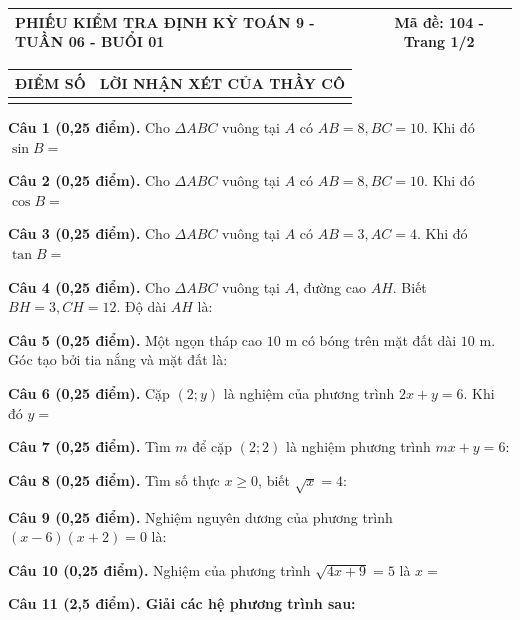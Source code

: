 \documentclass[12pt,a4paper]{article}
\begin{document}
\noindent
\begin{tabularx}{\linewidth}{|X|c|}
\hline
\textbf{PHIẾU KIỂM TRA ĐỊNH KỲ TOÁN 9 - TUẦN 06 - BUỔI 01} & \textbf{Mã đề: 104 - Trang 1/2} \\
\hline
\end{tabularx}

\vspace{1.0mm}

\noindent
\begin{tabularx}{\linewidth}{|p{3.2cm}|X|}
\hline
\centering\textbf{ĐIỂM SỐ} & \centering\textbf{LỜI NHẬN XÉT CỦA THẦY CÔ} \tabularnewline
\hline
\rule{0pt}{1.8cm} & \tabularnewline
\hline
\end{tabularx}

\vspace{1.2mm}
\noindent\textbf{Câu 1 (0,25 điểm).} Cho $\Delta ABC$ vuông tại $A$ có $AB = 8, BC = 10$. Khi đó $\sin B =$ \par\vspace{0.8mm}
\noindent\textbf{Câu 2 (0,25 điểm).} Cho $\Delta ABC$ vuông tại $A$ có $AB = 8, BC = 10$. Khi đó $\cos B =$ \par\vspace{0.8mm}
\noindent\textbf{Câu 3 (0,25 điểm).} Cho $\Delta ABC$ vuông tại $A$ có $AB = 3, AC = 4$. Khi đó $\tan B =$ \par\vspace{0.8mm}
\noindent\textbf{Câu 4 (0,25 điểm).} Cho $\Delta ABC$ vuông tại $A$, đường cao $AH$. Biết $BH=3, CH=12$. Độ dài $AH$ là: \par\vspace{0.8mm}
\noindent\textbf{Câu 5 (0,25 điểm).} Một ngọn tháp cao $10\text{ m}$ có bóng trên mặt đất dài $10\text{ m}$. Góc tạo bởi tia nắng và mặt đất là: \par\vspace{0.8mm}
\noindent\textbf{Câu 6 (0,25 điểm).} Cặp $(2; y)$ là nghiệm của phương trình $2x + y = 6$. Khi đó $y =$ \par\vspace{0.8mm}
\noindent\textbf{Câu 7 (0,25 điểm).} Tìm $m$ để cặp $(2; 2)$ là nghiệm phương trình $mx + y = 6$: \par\vspace{0.8mm}
\noindent\textbf{Câu 8 (0,25 điểm).} Tìm số thực $x \ge 0$, biết $\sqrt{x} = 4$: \par\vspace{0.8mm}
\noindent\textbf{Câu 9 (0,25 điểm).} Nghiệm nguyên dương của phương trình $(x - 6)(x + 2) = 0$ là: \par\vspace{0.8mm}
\noindent\textbf{Câu 10 (0,25 điểm).} Nghiệm của phương trình $\sqrt{4x + 9} = 5$ là $x =$ \par\vspace{0.8mm}
\vspace{0.8mm}
\noindent\textbf{Câu 11 (2,5 điểm). Giải các hệ phương trình sau:}
\vspace{0.6mm}
\end{document}
